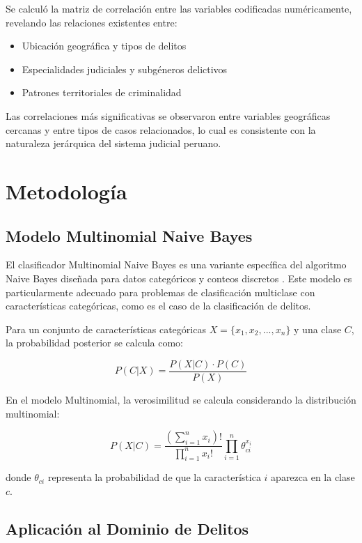 \documentclass[conference]{IEEEtran}
\begin{document}
Se calculó la matriz de correlación entre las variables codificadas numéricamente, revelando las relaciones existentes entre:
\begin{itemize}
\item Ubicación geográfica y tipos de delitos
\item Especialidades judiciales y subgéneros delictivos
\item Patrones territoriales de criminalidad
\end{itemize}

Las correlaciones más significativas se observaron entre variables geográficas cercanas y entre tipos de casos relacionados, lo cual es consistente con la naturaleza jerárquica del sistema judicial peruano.

\section{Metodología}

\subsection{Modelo Multinomial Naive Bayes}

El clasificador Multinomial Naive Bayes es una variante específica del algoritmo Naive Bayes diseñada para datos categóricos y conteos discretos \cite{ref4}. Este modelo es particularmente adecuado para problemas de clasificación multiclase con características categóricas, como es el caso de la clasificación de delitos.

Para un conjunto de características categóricas $X = \{x_1, x_2, ..., x_n\}$ y una clase $C$, la probabilidad posterior se calcula como:

\begin{equation}
P(C|X) = \frac{P(X|C) \cdot P(C)}{P(X)}
\end{equation}

En el modelo Multinomial, la verosimilitud se calcula considerando la distribución multinomial:

\begin{equation}
P(X|C) = \frac{(\sum_{i=1}^{n} x_i)!}{\prod_{i=1}^{n} x_i!} \prod_{i=1}^{n} \theta_{ci}^{x_i}
\end{equation}

donde $\theta_{ci}$ representa la probabilidad de que la característica $i$ aparezca en la clase $c$.

\subsection{Aplicación al Dominio de Delitos}
\end{document}
